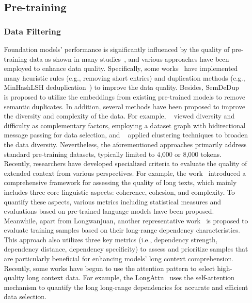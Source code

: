 \documentclass[11pt, a4paper, logo, copyright, nonumbering]{map}
\begin{document}
\subsection{Pre-training}
\label{sec:pt_data}

\subsubsection{Data Filtering}
Foundation models' performance is significantly influenced by the quality of pre-training data as shown in many studies~\citep{gopher, phi, glam, zhang2024mapneo},
and various approaches have been employed to enhance data quality. 
Specifically, some works~\cite{raffel2020exploring,slimpajama,zhang2024mapneo} have implemented many heuristic rules (e.g., removing short entries) and duplication methods (e.g., MinHashLSH deduplication~\citep{leskovec2020mining}) to improve the data quality. 
Besides, SemDeDup~\citep{SemDeDup} is proposed to utilize the embeddings from existing pre-trained models to remove semantic duplicates.
In addition, several methods have been proposed to improve the diversity and complexity of the data. For example, ~\citet{D2} viewed diversity and difficulty as complementary factors, employing a dataset graph with bidirectional message passing for data selection,
and 
~\citet{D4} applied clustering techniques to broaden the data diversity. 
Nevertheless, the aforementioned approaches primarily address standard pre-training datasets, typically limited to 4,000 or 8,000 tokens. Recently, researchers have developed specialized criteria to evaluate the quality of extended context from various perspectives. For example, the work~\citep{liu-etal-2024-longwanjuan} introduced a comprehensive framework for assessing the quality of long texts,
which mainly includes three core linguistic aspects: coherence, cohesion, and complexity.
To quantify these aspects, various metrics including statistical measures and evaluations based on pre-trained language models have been proposed.
Meanwhile, apart from Longwanjuan, 
another representative work~\citep{prolong} is proposed to evaluate training samples based on their long-range dependency characteristics. This approach also utilizes three key metrics (i.e., dependency strength, dependency distance, dependency specificity) to assess and prioritize samples that are particularly beneficial for enhancing models' long context comprehension.
Recently, some works have begun to use the attention pattern to select high-quality long context data.
For example,
the LongAttn~\citep{wu2025longattn} uses the self-attention mechanism to quantify the long
long-range dependencies for
accurate and efficient data selection.
\end{document}
